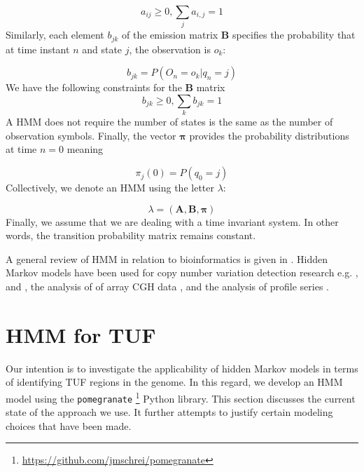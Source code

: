 \begin{equation}
a_{ij} \geq 0, \sum_{j} a_{i,j} = 1 
\end{equation}
Similarly, each element $b_{jk}$ of the emission matrix $\mathbf{B}$ specifies the probability that at time instant $n$ and state $j$, the observation is $o_k$:

\begin{equation}
b_{jk} = P(O_n = o_k | q_n = j)
\end{equation}
We have the following constraints for the $\mathbf{B}$ matrix
\begin{equation}
b_{jk} \geq 0, \sum_{k} b_{jk} = 1 
\label{emiss_prob_cond}
\end{equation}
A HMM does not require the number of states is the same as the number of observation symbols.
Finally, the vector $\boldsymbol{\pi}$ provides the probability distributions at time $n=0$ meaning 

\begin{equation}
\pi_j(0) = P(q_0 = j)
\end{equation}
Collectively, we denote an HMM using the letter $\lambda$:

\begin{equation}
\lambda = (\mathbf{A}, \mathbf{B}, \boldsymbol{\pi})
\label{hmm}
\end{equation}
Finally, we assume that we are dealing with a time invariant system. In other words, the transition probability matrix remains constant. 

A general review of HMM in relation to bioinformatics is given in \cite{koski}. Hidden Markov models have been used for copy number variation detection research e.g. \cite{coella2007},  \cite{Wang2007} and  \cite{cahan2008}, the analysis of of array CGH data \cite{fridlyand2004}, and the analysis of profile series \cite{Sschliep2003}.


\section{HMM for TUF}
\label{hmm_tuf}

Our intention is to investigate the applicability of hidden Markov models in terms of identifying TUF regions in the genome. 
In this regard, we develop an HMM model using the \texttt{pomegranate} \footnote{\url{https://github.com/jmschrei/pomegranate}} Python library.
This section discusses the current state of the approach we use. It further attempts to justify certain modeling choices that have been made. 

